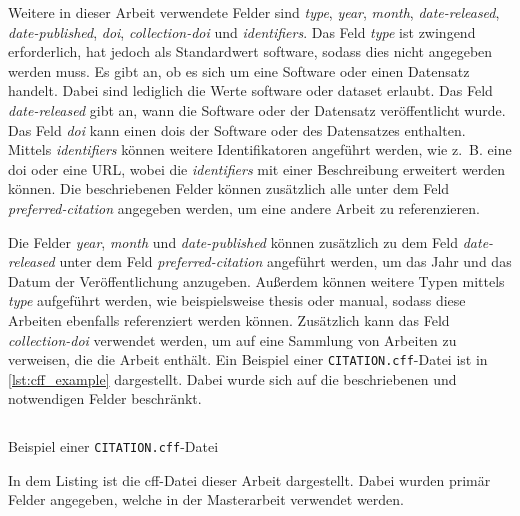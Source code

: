 Weitere in dieser Arbeit verwendete Felder sind \emph{type}, \emph{year}, \emph{month}, \emph{date-released}, \emph{date-published}, \emph{doi}, \emph{collection-doi} und \emph{identifiers}.
Das Feld \emph{type} ist zwingend erforderlich, hat jedoch als Standardwert \glqq software\grqq{}, sodass dies nicht angegeben werden muss.
Es gibt an, ob es sich um eine Software oder einen Datensatz handelt.
Dabei sind lediglich die Werte \glqq software\grqq{} oder \glqq dataset\grqq{} erlaubt.
Das Feld \emph{date-released} gibt an, wann die Software oder der Datensatz veröffentlicht wurde.
Das Feld \emph{doi} kann einen \glspl{doi} der Software oder des Datensatzes enthalten.
Mittels \emph{identifiers} können weitere Identifikatoren angeführt werden, wie z.~B. eine \gls{doi} oder eine URL, wobei die \emph{identifiers} mit einer Beschreibung erweitert werden können.
Die beschriebenen Felder können zusätzlich alle unter dem Feld \emph{preferred-citation} angegeben werden, um eine andere Arbeit zu referenzieren.

Die Felder \emph{year}, \emph{month} und \emph{date-published} können zusätzlich zu dem Feld \emph{date-released} unter dem Feld \emph{preferred-citation} angeführt werden, um das Jahr und das Datum der Veröffentlichung anzugeben.
Außerdem können weitere Typen mittels \emph{type} aufgeführt werden, wie beispielsweise \glqq thesis\grqq{} oder \glqq manual\grqq{}, sodass diese Arbeiten ebenfalls referenziert werden können.
Zusätzlich kann das Feld \emph{collection-doi} verwendet werden, um auf eine Sammlung von Arbeiten zu verweisen, die die Arbeit enthält.
Ein Beispiel einer \texttt{CITATION.cff}-Datei ist in \autoref{lst:cff_example} dargestellt.
Dabei wurde sich auf die beschriebenen und notwendigen Felder beschränkt.

\begin{listing}
    \inputminted{yaml}{../CITATION.cff}
    \caption{Beispiel einer \texttt{CITATION.cff}-Datei}
    \label{lst:cff_example}
    \small
    In dem Listing ist die \gls{cff}-Datei dieser Arbeit dargestellt. Dabei wurden primär Felder angegeben, welche in der Masterarbeit verwendet werden.
\end{listing}

